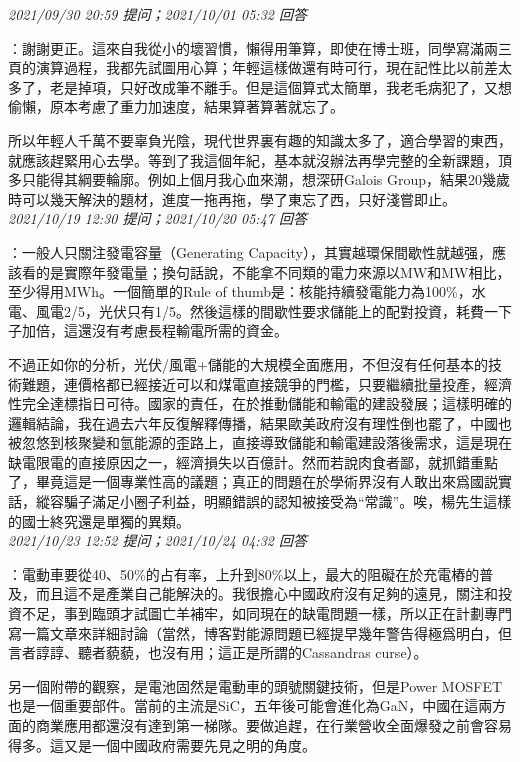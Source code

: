 \documentclass[twocolumn]{ctexart}
\begin{document}
\textit{\hfill\noindent\small 2021/09/30 20:59 提问；2021/10/01 05:32 回答}

：謝謝更正。這來自我從小的壞習慣，懶得用筆算，即使在博士班，同學寫滿兩三頁的演算過程，我都先試圖用心算；年輕這樣做還有時可行，現在記性比以前差太多了，老是掉項，只好改成筆不離手。但是這個算式太簡單，我老毛病犯了，又想偷懶，原本考慮了重力加速度，結果算著算著就忘了。

所以年輕人千萬不要辜負光陰，現代世界裏有趣的知識太多了，適合學習的東西，就應該趕緊用心去學。等到了我這個年紀，基本就沒辦法再學完整的全新課題，頂多只能得其綱要輪廓。例如上個月我心血來潮，想深研Galois Group，結果20幾歲時可以幾天解決的題材，進度一拖再拖，學了東忘了西，只好淺嘗即止。
\\

\textit{\hfill\noindent\small 2021/10/19 12:30 提问；2021/10/20 05:47 回答}

：一般人只關注發電容量（Generating Capacity），其實越環保間歇性就越强，應該看的是實際年發電量；換句話說，不能拿不同類的電力來源以MW和MW相比，至少得用MWh。一個簡單的Rule of thumb是：核能持續發電能力為100\%，水電、風電2/5，光伏只有1/5。然後這樣的間歇性要求儲能上的配對投資，耗費一下子加倍，這還沒有考慮長程輸電所需的資金。

不過正如你的分析，光伏/風電+儲能的大規模全面應用，不但沒有任何基本的技術難題，連價格都已經接近可以和煤電直接競爭的門檻，只要繼續批量投產，經濟性完全達標指日可待。國家的責任，在於推動儲能和輸電的建設發展；這樣明確的邏輯結論，我在過去六年反復解釋傳播，結果歐美政府沒有理性倒也罷了，中國也被忽悠到核聚變和氫能源的歪路上，直接導致儲能和輸電建設落後需求，這是現在缺電限電的直接原因之一，經濟損失以百億計。然而若說肉食者鄙，就抓錯重點了，畢竟這是一個專業性高的議題；真正的問題在於學術界沒有人敢出來爲國説實話，縱容騙子滿足小圈子利益，明顯錯誤的認知被接受為“常識”。唉，楊先生這樣的國士終究還是單獨的異類。
\\

\textit{\hfill\noindent\small 2021/10/23 12:52 提问；2021/10/24 04:32 回答}

：電動車要從40、50\%的占有率，上升到80\%以上，最大的阻礙在於充電樁的普及，而且這不是產業自己能解決的。我很擔心中國政府沒有足夠的遠見，關注和投資不足，事到臨頭才試圖亡羊補牢，如同現在的缺電問題一樣，所以正在計劃專門寫一篇文章來詳細討論（當然，博客對能源問題已經提早幾年警告得極爲明白，但言者諄諄、聽者藐藐，也沒有用；這正是所謂的Cassandras curse）。

另一個附帶的觀察，是電池固然是電動車的頭號關鍵技術，但是Power MOSFET也是一個重要部件。當前的主流是SiC，五年後可能會進化為GaN，中國在這兩方面的商業應用都還沒有達到第一梯隊。要做追趕，在行業營收全面爆發之前會容易得多。這又是一個中國政府需要先見之明的角度。
\end{document}
